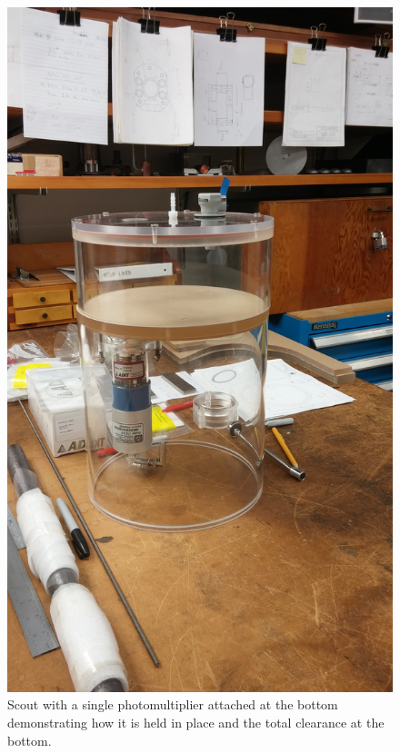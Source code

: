 \documentclass[]{article}
\begin{document}
\begin{figure}
  \centering
  \includegraphics[width=\textwidth, angle=270]{scout_construction.jpg}
  \caption{Scout with a single photomultiplier attached at the bottom demonstrating how it
  is held in place and the total clearance at the bottom.}
\end{figure}
\end{document}
